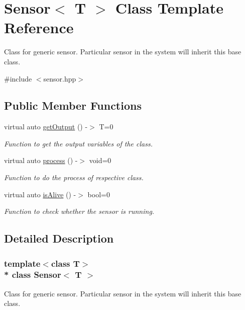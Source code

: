 \hypertarget{class_sensor}{}\section{Sensor$<$ T $>$ Class Template Reference}
\label{class_sensor}


Class for generic sensor. Particular sensor in the system will inherit this base class.  




{\ttfamily \#include $<$sensor.\+hpp$>$}

\subsection*{Public Member Functions}
\begin{DoxyCompactItemize}
\item 
virtual auto \hyperlink{class_sensor_abdc2eb130cb935cb090470d1fe6cc499}{get\+Output} () -\/$>$ T=0
\begin{DoxyCompactList}\small\item\em Function to get the output variables of the class. \end{DoxyCompactList}\item 
virtual auto \hyperlink{class_sensor_a6482196cbd29fb6bdc0b03d8af26d501}{process} () -\/$>$ void=0
\begin{DoxyCompactList}\small\item\em Function to do the process of respective class. \end{DoxyCompactList}\item 
virtual auto \hyperlink{class_sensor_a7ae0a8c02805d3b2b8306d01da2a2db8}{is\+Alive} () -\/$>$ bool=0
\begin{DoxyCompactList}\small\item\em Function to check whether the sensor is running. \end{DoxyCompactList}\end{DoxyCompactItemize}


\subsection{Detailed Description}
\subsubsection*{template$<$class T$>$\\*
class Sensor$<$ T $>$}

Class for generic sensor. Particular sensor in the system will inherit this base class. 

